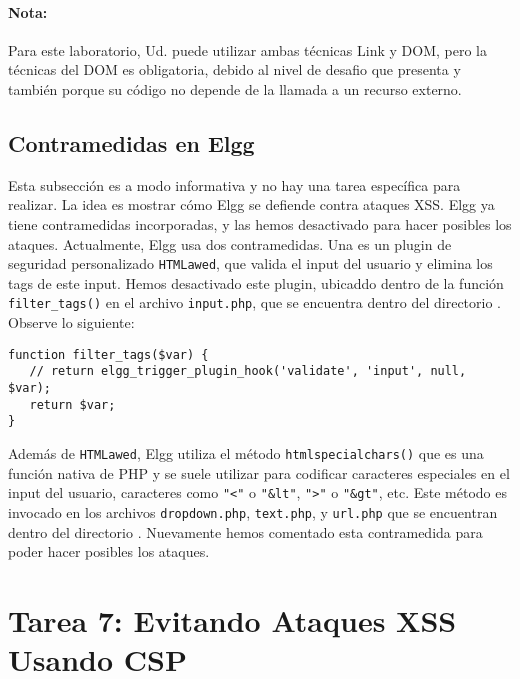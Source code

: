 \paragraph{Nota:} Para este laboratorio, Ud. puede utilizar ambas técnicas Link y DOM, pero la técnicas del DOM es obligatoria, debido al nivel de desafio que presenta y también porque su código no depende de la llamada a un recurso externo.



\subsection{Contramedidas en Elgg}

Esta subsección es a modo informativa y no hay una tarea específica para realizar.
La idea es mostrar cómo Elgg se defiende contra ataques XSS.
Elgg ya tiene contramedidas incorporadas, y
las hemos desactivado para hacer posibles los ataques. Actualmente, Elgg usa dos contramedidas.
Una es un plugin de seguridad personalizado \texttt{HTMLawed},
que valida el input del usuario y elimina los tags de este input.
Hemos desactivado este plugin, 
ubicaddo dentro de la función \texttt{filter\_tags()}
en el archivo \texttt{input.php}, que se encuentra dentro del directorio
. Observe lo siguiente:

\begin{lstlisting}
function filter_tags($var) {
   // return elgg_trigger_plugin_hook('validate', 'input', null, $var);
   return $var;
}
\end{lstlisting}
 
Además de {\tt HTMLawed}, Elgg utiliza el método \texttt{htmlspecialchars()} que es una función nativa de PHP y se suele utilizar para codificar caracteres especiales en el input del usuario, caracteres como {\tt "<"} o {\tt "\&lt"}, {\tt ">"} o {\tt "\&gt"}, etc.
Este método es invocado en los archivos \texttt{dropdown.php}, \texttt{text.php}, 
y \texttt{url.php} que se encuentran dentro del directorio .
Nuevamente hemos comentado esta contramedida para poder hacer posibles los ataques.

\section{Tarea 7: Evitando Ataques XSS Usando CSP}

